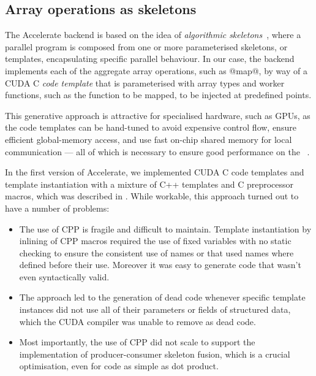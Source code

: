 \subsection{Array operations as skeletons}

The Accelerate \CUDA backend is based on the idea of \emph{algorithmic
skeletons}~\cite{Cole:1989vr}, where a parallel program is composed from one or
more parameterised skeletons, or templates, encapsulating specific parallel
behaviour. In our case, the backend implements each of the aggregate array
operations, such as @map@, by way of a CUDA C \emph{code template} that is
parameterised with array types and worker functions, such as the function to be
mapped, to be injected at predefined points.

This generative approach is attractive for specialised hardware, such as GPUs,
as the code templates can be hand-tuned to avoid expensive control flow, ensure
efficient global-memory access, and use fast on-chip shared memory for local
communication --- all of which is necessary to ensure good performance on the
\GPU~\cite{NVIDIA:2012wf}.

In the first version of Accelerate, we implemented CUDA C code templates and
template instantiation with a mixture of C++ templates and C preprocessor
macros, which was described in \cite{Chakravarty:2011fr}. While workable, this
approach turned out to have a number of problems:

\begin{itemize}
    \item The use of CPP is fragile and difficult to maintain. Template
        instantiation by inlining of CPP macros required the use of fixed
        variables with no static checking to ensure the consistent use of names
        or that used names where defined before their use. Moreover it was easy
        to generate code that wasn't even syntactically valid.

    \item The approach led to the generation of dead code whenever specific
        template instances did not use all of their parameters or fields of
        structured data, which the CUDA compiler was unable to remove as dead
        code.

    \item Most importantly, the use of CPP did not scale to support the
        implementation of producer-consumer skeleton fusion, which is a crucial
        optimisation, even for code as simple as dot product.

\end{itemize}

